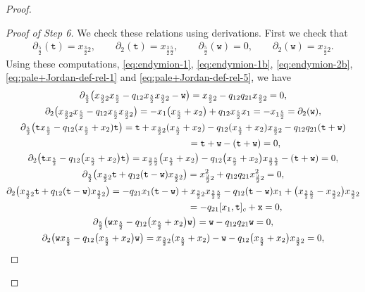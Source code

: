 \documentclass[pdftex]{sigma}
\numberwithin{equation}{section}
\newcommand{\ttt}{\mathtt{t}}
\newcommand{\wt}{\mathtt{w}}
\newcommand{\xt}{\mathtt{x}}
\newcommand{\tresdos}{\frac{3}{2}}
\newcommand{\cincodos}{\frac{5}{2}}
\begin{document}
\begin{proof}
\begin{proof}[Proof of Step 6]
We check these relations using derivations.
First we check that
\begin{align*}
\partial_{\cincodos}(\ttt)=x_{\tresdos2}, \qquad
\partial_{2}(\ttt)=x_{\tresdos\cincodos},\qquad
\partial_{\cincodos}(\wt)=0, \qquad
\partial_{2}(\wt)=x_{\tresdos2}.
\end{align*}
Using these computations, \eqref{eq:endymion-1}, \eqref{eq:endymion-1b}, \eqref{eq:endymion-2b}, \eqref{eq:pale+Jordan-def-rel-1} and \eqref{eq:pale+Jordan-def-rel-5}, we have
\begin{gather*}
\partial_{\cincodos} \big(x_{\tresdos2}x_{\cincodos}-q_{12}x_{\cincodos}x_{\tresdos2}-\wt\big) =x_{\tresdos2}-q_{12}q_{21}x_{\tresdos2}=0,
\\
\partial_{2} \big(x_{\tresdos2}x_{\cincodos}-q_{12}x_{\cincodos}x_{\tresdos2}\big) = -x_1\big(x_{\cincodos}+x_2\big)+q_{12}x_{\cincodos}x_1=-x_{1\cincodos}=\partial_2(\wt),
\\
\partial_{\cincodos} \big(\ttt x_{\cincodos}-q_{12}(x_{\cincodos}+x_{2})\ttt\big)
=\ttt+x_{\tresdos2} (x_{\cincodos}+x_2)-q_{12}(x_{\cincodos}+x_{2})x_{\tresdos2}-q_{12}q_{21}(\ttt+\wt)
\\ \hphantom{\partial_{\cincodos} \big(\ttt x_{\cincodos}-q_{12}(x_{\cincodos}+x_{2})\ttt\big)}
{} = \ttt+\wt- (\ttt+\wt)=0,
\\
\partial_{2} \big(\ttt x_{\cincodos}-q_{12}\big(x_{\cincodos}+x_{2}\big)\ttt\big) = x_{\tresdos\cincodos} \big(x_{\cincodos}+x_2\big)-q_{12}\big(x_{\cincodos}+x_{2}\big)x_{\tresdos\cincodos}
-(\ttt+\wt)=0,
\\
\partial_{\cincodos} \big(x_{\tresdos2} \ttt+q_{12}(\ttt-\wt)x_{\tresdos2}\big)= x_{\tresdos2}^2+q_{12}q_{21}x_{\tresdos2}^2=0,
\\
\partial_{2} \big(x_{\tresdos2} \ttt+q_{12}(\ttt-\wt)x_{\tresdos2}\big)
= -q_{21}x_1(\ttt-\wt)+x_{\tresdos2}x_{\tresdos\cincodos} -q_{12}(\ttt-\wt)x_1+\big(x_{\tresdos\cincodos}-x_{\tresdos2}\big)x_{\tresdos2}
\\ \hphantom{\partial_{2} \big(x_{\tresdos2} \ttt+q_{12}(\ttt-\wt)x_{\tresdos2}\big)}
{} = -q_{21}[x_1,\ttt]_c+\xt=0,
\\
\partial_{\cincodos} \big(\wt x_{\cincodos} -q_{12}\big(x_{\cincodos}+x_{2}\big)\wt\big)= \wt-q_{12}q_{21}\wt=0,
\\
\partial_{2} \big(\wt x_{\cincodos} -q_{12}\big(x_{\cincodos}+x_{2}\big)\wt\big) = x_{\tresdos2}(x_{\cincodos}+x_2)-\wt-q_{12}\big(x_{\cincodos}+x_2\big)x_{\tresdos2}=0,
\\

\end{gather*}
\end{proof}
\end{proof}
\end{document}
